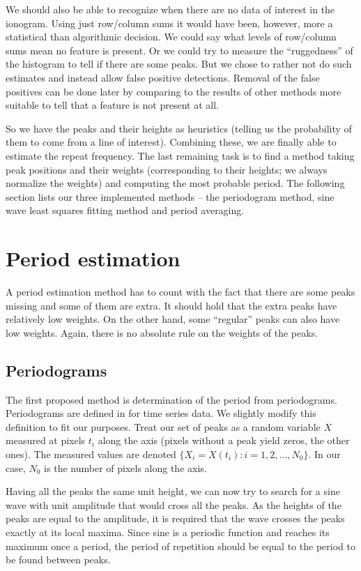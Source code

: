 We should also be able to recognize when there are no data of interest in the ionogram. Using just row/column sums it would have been, however, more a statistical than algorithmic decision. We could say what levels of row/column sums mean no feature is present. Or we could try to measure the ``ruggedness'' of the histogram to tell if there are some peaks. But we chose to rather not do such estimates and instead allow false positive detections. Removal of the false positives can be done later by comparing to the results of other methods more suitable to tell that a feature is not present at all. 

So we have the peaks and their heights as heuristics (telling us the probability of them to come from a line of interest). Combining these, we are finally able to estimate the repeat frequency. The last remaining task is to find a method taking peak positions and their weights (corresponding to their heights; we always normalize the weights) and computing the most probable period. The following section lists our three implemented methods -- the periodogram method, sine wave least squares fitting method and period averaging.

\section{Period estimation}
A period estimation method has to count with the fact that there are some peaks missing and some of them are extra. It should hold that the extra peaks have relatively low weights. On the other hand, some ``regular'' peaks can also have low weights. Again, there is no absolute rule on the weights of the peaks.

\subsection{Periodograms}
\label{ssec:periodogram}
The first proposed method is determination of the period from periodograms. Periodograms are defined in \citep{Scargle1982} for time series data. We slightly modify this definition to fit our purposes. Treat our set of peaks as a random variable $X$ measured at pixels $t_i$ along the axis (pixels without a peak yield zeros, the other ones). The measured values are denoted $\lbrace X_i = X(t_i): i = 1, 2, \ldots, N_0 \rbrace$. In our case, $N_0$ is the number of pixels along the axis. 

Having all the peaks the same unit height, we can now try to search for a sine wave with unit amplitude that would cross all the peaks. As the heights of the peaks are equal to the amplitude, it is required that the wave crosses the peaks exactly at its local maxima. Since sine is a periodic function and reaches its maximum once a period, the period of repetition should be equal to the period to be found between peaks.

